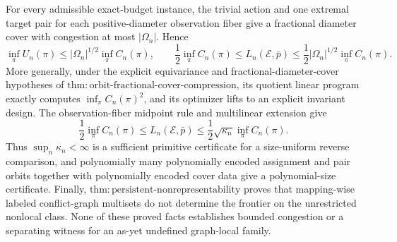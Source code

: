 For every admissible exact-budget instance, the trivial action and one extremal target pair for each positive-diameter observation fiber give a fractional diameter cover with congestion at most \(|\Omega_n|\). Hence
\[
 \inf_\pi U_n(\pi)
 \le |\Omega_n|^{1/2}\inf_\pi C_n(\pi),
 \qquad
 \frac12\inf_\pi C_n(\pi)
 \le L_n(\mathcal E,\bar p)
 \le \frac12|\Omega_n|^{1/2}\inf_\pi C_n(\pi).
\]
More generally, under the explicit equivariance and fractional-diameter-cover hypotheses of \(\mathrm{thm{:}orbit\text{-}fractional\text{-}cover\text{-}compression}\), its quotient linear program exactly computes \(\inf_\pi C_n(\pi)^2\), and its optimizer lifts to an explicit invariant design. The observation-fiber midpoint rule and multilinear extension give
\[
 \frac12\inf_\pi C_n(\pi)
 \le L_n(\mathcal E,\bar p)
 \le \frac12\sqrt{\kappa_n}\inf_\pi C_n(\pi).
\]
Thus \(\sup_n\kappa_n<\infty\) is a sufficient primitive certificate for a size-uniform reverse comparison, and polynomially many polynomially encoded assignment and pair orbits together with polynomially encoded cover data give a polynomial-size certificate. Finally, \(\mathrm{thm{:}persistent\text{-}nonrepresentability}\) proves that mapping-wise labeled conflict-graph multisets do not determine the frontier on the unrestricted nonlocal class. None of these proved facts establishes bounded congestion or a separating witness for an as-yet undefined graph-local family.